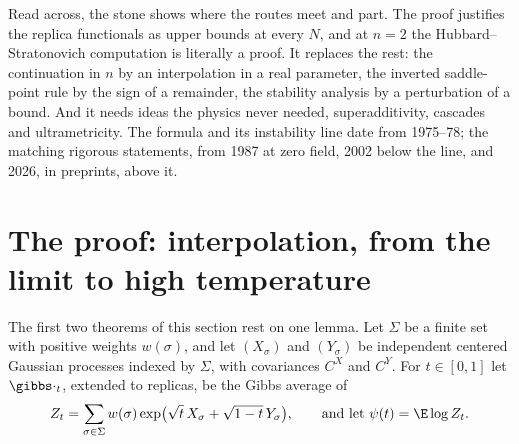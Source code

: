 \begin{refsection}
Read across, the stone shows where the routes meet and part. The proof justifies the replica functionals as upper bounds at every $N$, and at $n=2$ the Hubbard--Stratonovich computation is literally a proof. It replaces the rest: the continuation in $n$ by an interpolation in a real parameter, the inverted saddle-point rule by the sign of a remainder, the stability analysis by a perturbation of a bound. And it needs ideas the physics never needed, superadditivity, cascades and ultrametricity. The formula and its instability line date from 1975--78; the matching rigorous statements, from 1987 at zero field, 2002 below the line, and 2026, in preprints, above it.

\section{The proof: interpolation, from the limit to high temperature}\label{sec:sk:proof}

The first two theorems of this section rest on one lemma. Let $\Sigma$ be a finite set with positive weights $w(\sigma)$, and let $(X_\sigma)$ and $(Y_\sigma)$ be independent centered Gaussian processes indexed by $\Sigma$, with covariances $C^X$ and $C^Y$. For $t\in[0,1]$ let $\gibbs\cdot_t$, extended to replicas, be the Gibbs average of
\[
Z_t=\sum_{\sigma\in\Sigma}w(\sigma)\exp\bigl(\sqrt t\,X_\sigma+\sqrt{1-t}\,Y_\sigma\bigr),\qquad\text{and let }\psi(t)=\E\log Z_t.
\]



\end{refsection}
